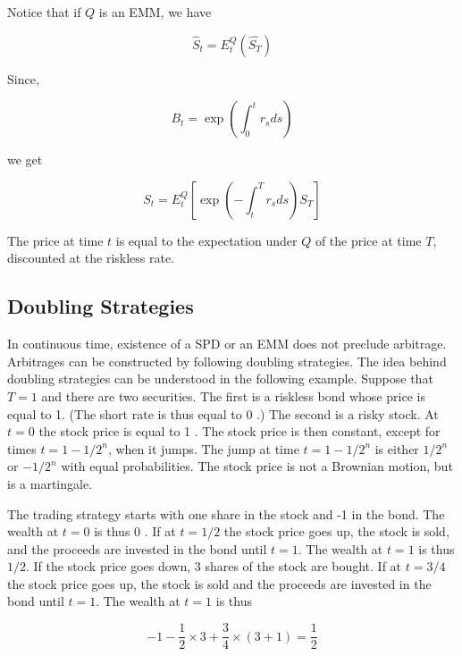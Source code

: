 \documentclass[\topdir/lecture\_notes.tex]{subfiles}
\begin{document}
Notice that if \(Q\) is an EMM, we have

\begin{equation*}
\hat{S}_{t}=E_{t}^{Q}\left(\hat{S_{T}}\right)
\end{equation*}

Since,

\begin{equation*}
B_{t}=\exp \left(\int_{0}^{t} r_{s} d s\right)
\end{equation*}

we get

\begin{equation*}
S_{t}=E_{t}^{Q}\left[\exp \left(-\int_{t}^{T} r_{s} d s\right) S_{T}\right]
\end{equation*}

The price at time \(t\) is equal to the expectation under \(Q\) of the price at time \(T\), discounted at the riskless rate.

\subsection{Doubling Strategies}
In continuous time, existence of a SPD or an EMM does not preclude arbitrage. Arbitrages can be constructed by following doubling strategies. The idea behind doubling strategies can be understood in the following example. Suppose that \(T=1\) and there are two securities. The first is a riskless bond whose price is equal to 1. (The short rate is thus equal to 0 .) The second is a risky stock. At \(t=0\) the stock price is equal to 1 . The stock price is then constant, except for times \(t=1-1 / 2^{n}\), when it jumps. The jump at time \(t=1-1 / 2^{n}\) is either \(1 / 2^{n}\) or \(-1 / 2^{n}\) with equal probabilities. The stock price is not a Brownian motion, but is a martingale.

The trading strategy starts with one share in the stock and -1 in the bond. The wealth at \(t=0\) is thus 0 . If at \(t=1 / 2\) the stock price goes up, the stock is sold, and the proceeds are invested in the bond until \(t=1\). The wealth at \(t=1\) is thus \(1 / 2\). If the stock price goes down, 3 shares of the stock are bought. If at \(t=3 / 4\) the stock price goes up, the stock is sold and the proceeds are invested in the bond until \(t=1\). The wealth at \(t=1\) is thus

\begin{equation*}
-1-\frac{1}{2} \times 3+\frac{3}{4} \times(3+1)=\frac{1}{2}
\end{equation*}
\end{document}
